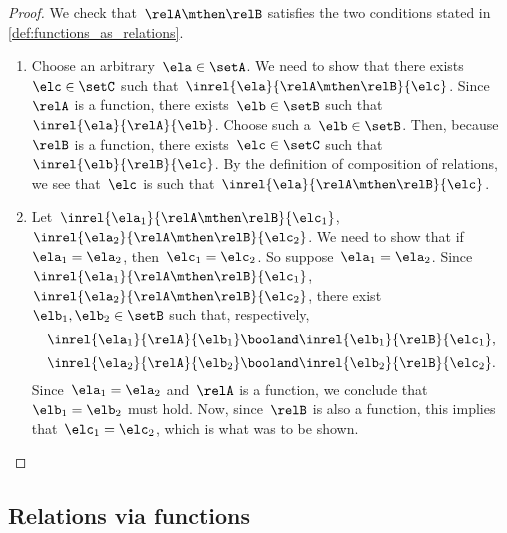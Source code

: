 \begin{proof}
    We check that~$\relA \mthen \relB$ satisfies the two conditions stated in \cref{def:functions_as_relations}.

    \begin{enumerate}
        \item Choose an arbitrary~$\ela \in \setA$.
              We need to show that there exists~$\elc \in \setC$ such that~$\inrel{\ela}{\relA \mthen \relB}{\elc}$.
              Since~$\relA$ is a function, there exists~$\elb \in \setB$ such that~$\inrel{\ela}{\relA}{\elb}$.
              Choose such a~$\elb \in \setB$.
              Then, because~$\relB$ is a function, there exists~$\elc \in \setC$ such that~$\inrel{\elb}{\relB}{\elc}$.
              By the definition of composition of relations, we see that~$\elc$ is such that~$\inrel{\ela}{\relA \mthen \relB}{\elc}$.
        \item Let~$\inrel{\ela_1}{\relA \mthen \relB}{\elc_1}$,~$\inrel{\ela_2}{\relA \mthen \relB}{\elc_2}$.
              We need to show that if~$\ela_1 = \ela_2$, then~$\elc_1 = \elc_2$.
              So suppose~$\ela_1 = \ela_2$.
              Since~$\inrel{\ela_1}{\relA \mthen \relB}{\elc_1}$,~$\inrel{\ela_2}{\relA \mthen \relB}{\elc_2}$, there exist~$\elb_1, \elb_2 \in \setB$ such that, respectively,
              \begin{equation*}
                  \inrel{\ela_1}{\relA}{\elb_1} \booland \inrel{\elb_1}{\relB}{\elc_1},
              \end{equation*}
              \begin{equation*}
                  \inrel{\ela_2}{\relA}{\elb_2} \booland \inrel{\elb_2}{\relB}{\elc_2}.
              \end{equation*}
              Since~$\ela_1 = \ela_2$ and~$\relA$ is a function, we conclude that~$\elb_1 = \elb_2$ must hold.
              Now, since~$\relB$ is also a function, this implies that~$\elc_1 = \elc_2$, which is what was to be shown.
    \end{enumerate}
\end{proof}



\subsection{Relations via functions}

